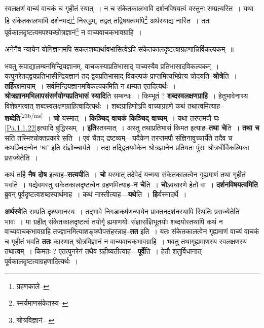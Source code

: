 \documentclass[article,12pt,a4paper]{memoir}
\begin{document}
	  \pstart स्वलक्षणं वाच्यं वाचकं च गृहीतं स्यात् । न च संकेतकालभावि दर्शनविषयत्वं वस्तुनः सम्प्रत्यस्ति । यथा हि संकेतकालभावि दर्शनमद्य\footnote{ग्रहणकाले--\cite{dp-msD-n}} निरुद्धम्, तद्वत् तद्विषयत्वमपि\footnote{स्मर्यमाणसंकेतस्य--\cite{dp-msD-n}} अर्थस्याद्य नास्ति । ततः पूर्वकालदृष्टत्वमपश्यच्छोत्रज्ञानं\footnote{श्रोत्रविज्ञानं--\cite{dp-msB} \cite{dp-msD} \cite{dp-edN}} न वाच्यवाचकभावग्राहि ।
	\pend
       

	  \pstart अनेनैव न्यायेन योगिज्ञानमपि सकलशब्दार्थावभासित्वेऽपि संकेतकालदृष्टत्वाग्रहणान्निर्विकल्पकम् ॥
	\pend
      

	  \pstart भवतु रूपाद्यालम्बनमिन्द्रियज्ञानम्, वाचकस्याप्रतिभासाद् वाच्यस्यैव प्रतिभासादविकल्पकम् । यत्पुनरेतद्द्वयप्रतिभासीन्द्रियज्ञानं तद् द्वयप्रतिभासाद् विकल्पकं प्राप्तमित्यभिप्रेत्य चोदयति--\textbf{श्रोत्रे}ति । \textbf{तर्हि}रक्षमायाम् । सर्वमिन्द्रियज्ञानमविकल्पकमिति न क्षम्यत एतदित्यर्थः । \textbf{श्रोत्रज्ञानमभिलापसंसर्गयोग्यप्रतिभासं स्यादि}ति सम्बन्धः । किम्भूतं ? \textbf{शब्दस्वलक्षणग्राहि} । हेतुभावेनास्य विशेषणत्वात् शब्दस्वलक्षणग्राहित्वादित्यर्थः । शब्दग्राहिणोऽपि वाच्याग्रहणे कथं तथात्वमित्याह--\textbf{शब्देति}\leavevmode\textsuperscript{\rmlatinfont\tiny [23b/ms]} । \textbf{चो} यस्मात् । \textbf{किञ्चिद् वाचकं किञ्चिद् वाच्यम्} । यथा तरप्तमपौ घः \cref{Pā.1.1.22}इत्यादि बुद्धिस्थम् । \textbf{इति}स्तस्मात् । अस्तु तथाप्रतिभासं किमत इत्याह--\textbf{तथा चे}ति । \textbf{तथा च} सति तस्मिश्चोक्तप्रकारे सति । एवं चैतद् द्रष्टव्यम्—यदैकेन तरप्तमपौ संज्ञिनावुच्चार्येते तदैव च कथञ्चिदन्येन ‘घः’ इति संज्ञोच्चार्यते । तदा तद्द्वितयमेकेन श्रोत्रज्ञानेन प्रतियतः पुंसः श्रोत्रधीर्विकल्पिका प्रसज्येतेति ।
	\pend
      

	  \pstart कथं तर्हि \textbf{नैष दोष} इत्याह--\textbf{सत्यपी}ति । \textbf{चो} यस्मात् तदेवेदं यन्मया संकेतकालत्वेन गृह्यमाणं तथा गृहीतं भवति । यद्येवमस्तु सकेतकालदृष्टत्वेन ग्रहणमित्याह--\textbf{न चे}ति । \textbf{चो}ऽवधारणे हेतौ वा । \textbf{दर्शनविषयत्वमिति} ब्रुवन् पूर्वदृष्टत्वशब्दस्यार्थमाह । कथं नास्तीत्याह—\textbf{यथे}ति । \textbf{हि}र्यस्मादर्थे ।
	\pend
      

	  \pstart \textbf{अर्थस्ये}ति सम्प्रति दृश्यमानस्य । तद्भावे निगडाकर्षणन्यायेन प्राक्तनदर्शनस्यापि स्थितिः प्रसज्येतेति भावः । मा ग्रहीत् संकेतकालदृष्टत्वं तयोर्गृ ह्यमाणयोः संज्ञासंज्ञिभूतयोः शब्दयोस्तथापि कथं न वाच्यवाचकभावग्राहि तज्ज्ञानमित्याशङ्क्योपसंहरन्नाह--\textbf{तत} इति । यतः संकेतकालत्वेन गृह्यमाणं वाच्यं वाचकं च गृहीतं भवति \textbf{ततः} कारणात् श्रोत्रविज्ञानं न वाच्यवाचकभावग्राहि । भवतु तथागृह्यमाणस्य स्वलक्षणस्य तथात्वम् । किमतः ? एतत्पुनरेनं तथैव ग्रहीष्यतीत्याह—\textbf{पूर्वे}ति । हेतौ शतुर्विधानात् पूर्वकालदृष्टत्वाग्रहणादित्यर्थः ।
	\pend
      
\end{document}
